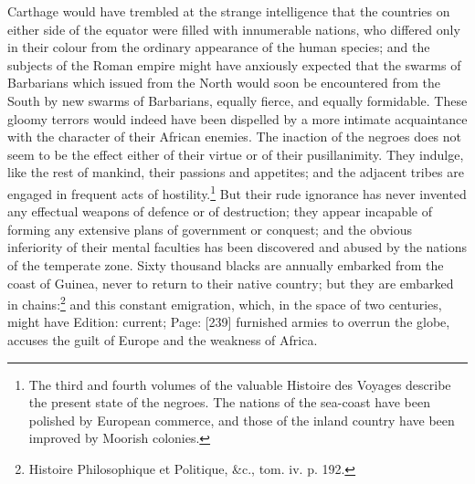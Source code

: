 Carthage would have trembled at the strange intelligence that the countries on either side of the equator were filled with innumerable nations, who differed only in their colour from the ordinary appearance of the human species; and the subjects of the Roman empire might have anxiously expected that the swarms of Barbarians which issued from the North would soon be encountered from the South by new swarms of Barbarians, equally fierce, and equally formidable. These gloomy terrors would indeed have been dispelled by a more intimate acquaintance with the character of their African enemies. The inaction of the negroes does not seem to be the effect either of their virtue or of their pusillanimity. They indulge, like the rest of mankind, their passions and appetites; and the adjacent tribes are engaged in frequent acts of hostility.\footnote{The third and fourth volumes of the valuable Histoire des Voyages describe the present state of the negroes. The nations of the sea-coast have been polished by European commerce, and those of the inland country have been improved by Moorish colonies.} But their rude ignorance has never invented any effectual weapons of defence or of destruction; they appear incapable of forming any extensive plans of government or conquest; and the obvious inferiority of their mental faculties has been discovered and abused by the nations of the temperate zone. Sixty thousand blacks are annually embarked from the coast of Guinea, never to return to their native country; but they are embarked in chains:\footnote{Histoire Philosophique et Politique, \&c., tom. iv. p. 192.} and this constant emigration, which, in the space of two centuries, might have Edition: current; Page: [239] furnished armies to overrun the globe, accuses the guilt of Europe and the weakness of Africa.

